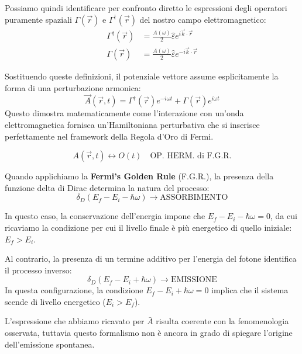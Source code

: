 Possiamo quindi identificare per confronto diretto le espressioni degli operatori puramente spaziali \(\Gamma(\vec{r})\) e \(\Gamma^\dagger(\vec{r})\) del nostro campo elettromagnetico:
\begin{align}
    \Gamma^\dagger(\vec{r}) &= \frac{A(\omega)}{2} \hat{\varepsilon} e^{i\vec{k} \cdot \vec{r}} \\[1.5ex]
    \Gamma(\vec{r}) &= \frac{A(\omega)}{2} \hat{\varepsilon} e^{-i\vec{k} \cdot \vec{r}}
\end{align}

Sostituendo queste definizioni, il potenziale vettore assume esplicitamente la forma di una perturbazione armonica:
\begin{equation}
    \vec{A}(\vec{r}, t) = \Gamma^\dagger(\vec{r}) e^{-i\omega t} + \Gamma(\vec{r}) e^{i\omega t}
\end{equation}
Questo dimostra matematicamente come l'interazione con un'onda elettromagnetica fornisca un'Hamiltoniana perturbativa che si inserisce perfettamente nel framework della Regola d'Oro di Fermi.

\begin{importantbox}
    \begin{equation}
        A(\vec{r},t) \longleftrightarrow O(t) \quad \text{OP. HERM. di F.G.R.}
    \end{equation}
\end{importantbox}

Quando applichiamo la \textbf{Fermi's Golden Rule} (F.G.R.), la presenza della funzione delta di Dirac determina la natura del processo:
\begin{equation}
    \delta_D(E_f - E_i - \hbar\omega) \longrightarrow \text{ASSORBIMENTO}
\end{equation}

In questo caso, la conservazione dell'energia impone che \( E_f - E_i - \hbar\omega = 0 \), da cui ricaviamo la condizione per cui il livello finale è più energetico di quello iniziale: \(E_f > E_i\).

Al contrario, la presenza di un termine additivo per l'energia del fotone identifica il processo inverso:
\begin{equation}
    \delta_D(E_f - E_i + \hbar\omega) \longrightarrow \text{EMISSIONE}
\end{equation}
In questa configurazione, la condizione \( E_f - E_i + \hbar\omega = 0 \) implica che il sistema scende di livello energetico (\( E_i > E_f \)).

L'espressione che abbiamo ricavato per \( \bar{A} \) risulta coerente con la fenomenologia osservata, tuttavia questo formalismo non è ancora in grado di spiegare l'origine dell'emissione spontanea.

